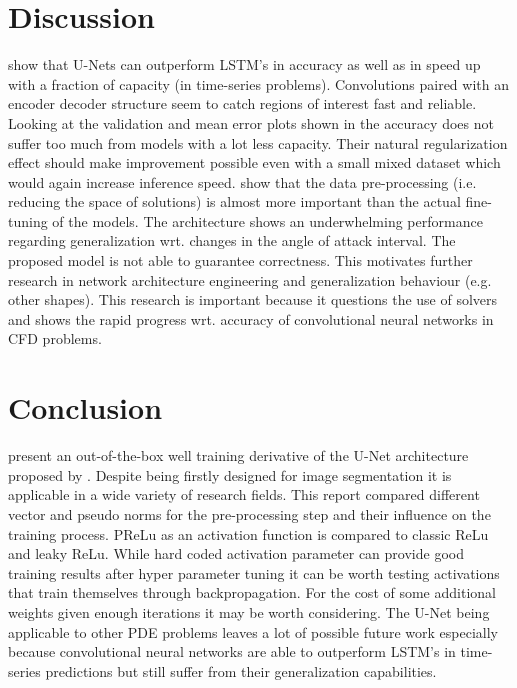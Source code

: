 \documentclass[acmtog]{techreportacmart}
\begin{document}
\section{Discussion}
\cite{Fotiadis2020} show that U-Nets can outperform LSTM's in accuracy as well as in speed 
up with a fraction of capacity (in time-series problems). Convolutions paired with an encoder 
decoder structure seem to catch regions of interest fast and reliable. Looking at the validation 
and mean error plots shown in \cite{Thuerey20} the accuracy does not suffer too much from models 
with a lot less capacity. Their natural regularization effect should make improvement possible 
even with a small mixed dataset which would again increase inference speed. 
\cite{Thuerey20} show that the data pre-processing (i.e. reducing 
the space of solutions) is almost more important than the actual fine-tuning of the models. 
The architecture shows an underwhelming performance regarding generalization wrt. changes in the
angle of attack interval. The proposed model is not able to guarantee correctness. This motivates
further research in network architecture engineering and generalization behaviour (e.g. other shapes).
This research is important because it questions the use of solvers and shows the rapid progress 
wrt. accuracy of convolutional neural networks in CFD problems.

\section{Conclusion} 
\cite{Thuerey20} present an out-of-the-box well training derivative of the U-Net architecture 
proposed by \cite{ronneberger2015}. Despite being firstly designed for image segmentation it is 
applicable in a wide variety of research fields. This report compared different vector and pseudo 
norms for the pre-processing step and their influence on the training process. PReLu as an activation 
function is compared to classic ReLu and leaky ReLu. While hard coded activation parameter can provide 
good training results after hyper parameter tuning it can be worth testing activations that train 
themselves through backpropagation. For the cost of some additional weights given enough iterations 
it may be worth considering. The U-Net being applicable to other PDE problems leaves a lot of possible 
future work especially because convolutional neural networks are able to outperform LSTM's in time-series predictions
but still suffer from their generalization capabilities. 

\newpage


\end{document}
